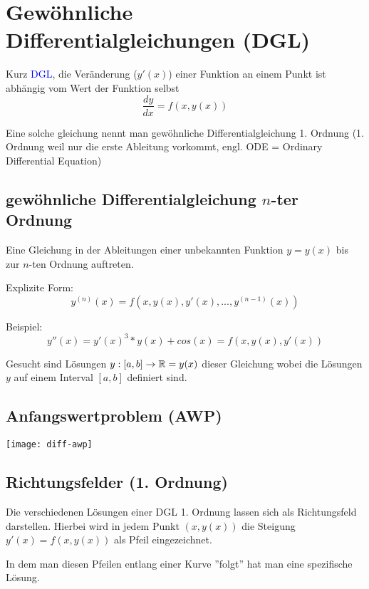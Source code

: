 \section{Gewöhnliche Differentialgleichungen (DGL)}

Kurz \textcolor{blue}{DGL}, die Veränderung ($y'(x)$) einer Funktion an einem Punkt ist abhängig vom Wert
der Funktion selbst
$$\frac{dy}{dx} = f(x, y(x))$$

Eine solche gleichung nennt man gewöhnliche Differentialgleichung 1. Ordnung
(1. Ordnung weil nur die erste Ableitung vorkommt, engl. ODE = Ordinary
Differential Equation)



\subsection{gewöhnliche Differentialgleichung $n$-ter Ordnung}

Eine Gleichung in der Ableitungen einer unbekannten Funktion $y = y(x)$ bis zur $n$-ten
Ordnung auftreten.

Explizite Form:
{\Large
$$y^{(n)}(x) = f(x, y(x), y'(x), ..., y^{(n-1)}(x))$$
}

Beispiel:
$$y''(x) = y'(x)^3 * y(x) + cos(x) = f(x, y(x), y'(x))$$

Gesucht sind Lösungen $y : [a,b] \to \mathbb{R} = y(x)$ dieser Gleichung wobei die Lösungen
$y$ auf einem Interval $[a,b]$ definiert sind.



\subsection{Anfangswertproblem (AWP)}

\texttt{[image: diff-awp]}












\subsection{Richtungsfelder (1. Ordnung)}

Die verschiedenen Lösungen einer DGL 1. Ordnung lassen sich als Richtungsfeld
darstellen. Hierbei wird in jedem Punkt $(x,y(x))$ die Steigung $y'(x) = f(x, y(x))$
als Pfeil eingezeichnet.

In dem man diesen Pfeilen entlang einer Kurve ''folgt'' hat man eine
spezifische Lösung.






